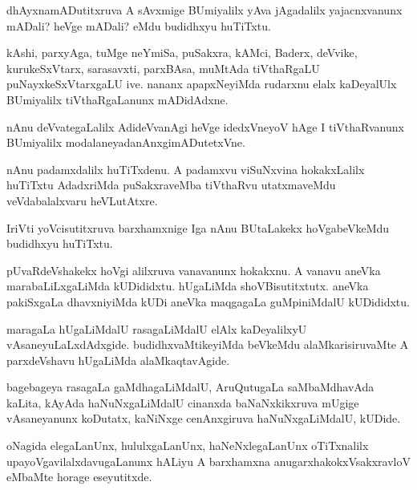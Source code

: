 \documentclass{article}
\begin{document}
\begin{mn}
dhAyxnamADutitxruva A sAvxmige BUmiyalilx yAva jAgadalilx
yajacnxvanunx mADali? heVge mADali? eMdu budidhxyu huTiTxtu.
\end{mn}

\begin{mn}%
kAshi, parxyAga, tuMge neYmiSa, puSakxra, kAMci, Baderx, deVvike,
kurukeSxVtarx, sarasavxti, parxBAsa, muMtAda tiVthaRgaLU
puNayxkeSxVtarxgaLU ive. nananx apapxNeyiMda rudarxnu elalx kaDeyalUlx
BUmiyalilx tiVthaRgaLanunx mADidAdxne.
\end{mn}

\begin{mn}
nAnu deVvategaLalilx AdideVvanAgi heVge idedxVneyoV hAge I
tiVthaRvanunx BUmiyalilx modalaneyadanAnxgimADutetxVne.
\end{mn}

\begin{mn}
nAnu padamxdalilx huTiTxdenu. A padamxvu viSuNxvina hokakxLalilx
huTiTxtu AdadxriMda puSakxraveMba tiVthaRvu utatxmaveMdu
veVdabalalxvaru heVLutAtxre.
\end{mn}

\begin{mn}%
IriVti yoVcisutitxruva barxhamxnige Iga nAnu BUtaLakekx hoVgabeVkeMdu
budidhxyu huTiTxtu.
\end{mn}

\begin{mn}%
pUvaRdeVshakekx hoVgi alilxruva vanavanunx hokakxnu. A vanavu aneVka
marabaLiLxgaLiMda kUDididxtu. hUgaLiMda shoVBisutitxtutx. aneVka
pakiSxgaLa dhavxniyiMda kUDi aneVka maqgagaLa guMpiniMdalU kUDididxtu.
\end{mn}

\begin{mn}
maragaLa hUgaLiMdalU rasagaLiMdalU elAlx kaDeyalilxyU
vAsaneyuLaLxdAdxgide. budidhxvaMtikeyiMda beVkeMdu alaMkarisiruvaMte A
parxdeVshavu hUgaLiMda alaMkaqtavAgide.
\end{mn}

\begin{mn}
bagebageya rasagaLa gaMdhagaLiMdalU, AruQutugaLa saMbaMdhavAda kaLita,
kAyAda haNuNxgaLiMdalU cinanxda baNaNxkikxruva mUgige vAsaneyanunx
koDutatx, kaNiNxge cenAnxgiruva haNuNxgaLiMdalU, kUDide.
\end{mn}

\begin{mn}%
oNagida elegaLanUnx, hululxgaLanUnx, haNeNxlegaLanUnx oTiTxnalilx
upayoVgavilalxdavugaLanunx hALiyu A barxhamxna
anugarxhakokxVsakxravloV eMbaMte horage eseyutitxde.
\end{mn}
\end{document}
